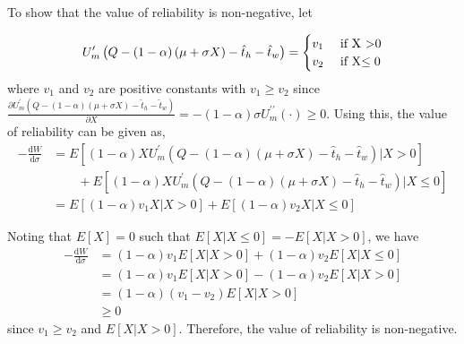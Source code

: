 \documentclass[12pt,a4paper,british]{article}
\makeatletter
\theoremstyle{definition}
\theoremstyle{plain}
\newenvironment{proof}[1][\proofname]{\par
    \normalfont\topsep6\p@\@plus6\p@\relax
    \trivlist
    \itemindent\parindent
    \item[\hskip\labelsep
          \scshape
      #1]\ignorespaces
  }{%
    \endtrivlist\@endpefalse
  }
\providecommand{\proofname}{Proof}
\theoremstyle{plain}
\makeatother
\begin{document}
\begin{proof}
To show that the value of reliability is non-negative, let

\begin{equation*}
U_{m}^{\prime}\left(Q-\left(1-\alpha\right)\left(\mu+\sigma X\right)-\hat{t}_{h}-\hat{t}_{w}\right)=\begin{cases}
v_{1} & \mbox{ if X >0}\\
v_{2} & \mbox{ if X\ensuremath{\leq0}}
\end{cases}
\end{equation*}%
where $v_{1}$ and $v_{2}$ are positive constants with $v_{1}\geq v_{2}$ since $\frac{\partial U_{m}^{\prime}\left(Q-\left(1-\alpha\right)\left(\mu+\sigma X\right)-\hat{t}_{h}-\hat{t}_{w}\right)}{\partial X}=-\left(1-\alpha\right)\sigma U_{m}^{\prime\prime}\left(\cdot\right)\geq0$. Using this, the value of reliability can be given as,%
\begin{align*}
-\frac{\mathrm{d}W}{\mathrm{d}\sigma} & =E\left[\left(1-\alpha\right)XU_{m}^{\prime}\left(Q-\left(1-\alpha\right)\left(\mu+\sigma X\right)-\hat{t}_{h}-\hat{t}_{w}\right)\vert X>0\right]\\
 & \qquad+E\left[\left(1-\alpha\right)XU_{m}^{\prime}\left(Q-\left(1-\alpha\right)\left(\mu+\sigma X\right)-\hat{t}_{h}-\hat{t}_{w}\right)\vert X\leq0\right]\\
 & =E\left[\left(1-\alpha\right)v_{1}X\vert X>0\right]+E\left[\left(1-\alpha\right)v_{2}X\vert X\leq0\right]
\end{align*}

Noting that $E\left[X\right]=0$ such that $E\left[X\vert X\leq0\right]=-E\left[X\vert X>0\right]$, we have
\begin{align*}
-\frac{\mathrm{d}W}{\mathrm{d}\sigma} & =\left(1-\alpha\right)v_{1}E\left[X\vert X>0\right]+\left(1-\alpha\right)v_{2}E\left[X\vert X\leq0\right]\\
 & =\left(1-\alpha\right)v_{1}E\left[X\vert X>0\right]-\left(1-\alpha\right)v_{2}E\left[X\vert X>0\right]\\
 & =\left(1-\alpha\right)\left(v_{1}-v_{2}\right)E\left[X\vert X>0\right]\\
 & \geq0
\end{align*}
since $v_{1}\geq v_{2}$ and $E\left[X\vert X>0\right]$. Therefore, the value of reliability is non-negative.


\end{proof}
\end{document}
